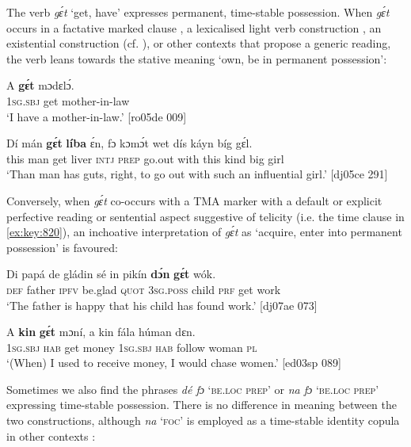 The verb \textit{gɛ́t} ‘get, have’ expresses permanent, time-stable possession. When \textit{gɛ́t} occurs in a factative marked clause , a lexicalised light verb construction , an existential construction (cf. ), or other contexts that propose a generic reading, the verb leans towards the stative meaning ‘own, be in permanent possession’: 


\ea%
    \label{ex:key:817}
    \gll A    \textbf{gɛ́t}  mɔdɛlɔ́.\\
\textsc{1sg.sbj}  get  mother-in-law\\

\glt ‘I have a mother-in-law.’ [ro05de 009]
\z


\ea%
    \label{ex:key:818}
    \gll Dí  mán    \textbf{gɛ́t}  \textbf{líba}    ɛ́n,  fɔ  kɔmɔ́t  wet    dís  káyn  bíg  gɛ́l.\\
this  man    get  liver  \textsc{intj}  \textsc{prep}  go.out  with    this   kind    big  girl\\

\glt ‘Than man has guts, right, to go out with such an influential girl.’ [dj05ce 291]
\z

Conversely, when \textit{gɛ́t} co-occurs with a TMA marker with a default or explicit perfective reading  or sentential aspect suggestive of telicity (i.e. the time clause in \ref{ex:key:820}), an inchoative interpretation of \textit{gɛ́t} as ‘acquire, enter into permanent possession’ is favoured: 


\ea%
    \label{ex:key:819}
    \gll Di  papá  de  gládin  sé    in    pikín  \textbf{dɔ́n}  \textbf{gɛ́t}  wók.\\
\textsc{def}  father  \textsc{ipfv}  be.glad  \textsc{quot}    \textsc{3sg.poss}  child  \textsc{prf}  get  work\\

\glt ‘The father is happy that his child has found work.’ [dj07ae 073]
\z


\ea%
    \label{ex:key:820}
    \gll A    \textbf{kin}  \textbf{gɛ́t}  mɔní,  a    kin  fála    húman  dɛn.\\
\textsc{1sg.sbj}  \textsc{hab}  get  money  \textsc{1sg.sbj}  \textsc{hab}  follow  woman  \textsc{pl}\\

\glt ‘(When) I used to receive money, I would chase women.’ [ed03sp 089]
\z

Sometimes we also find the phrases \textit{dé fɔ} ‘\textsc{be.loc} \textsc{prep}’ or \textit{na fɔ} ‘\textsc{be.loc} \textsc{prep}’ expressing time-stable possession. There is no difference in meaning between the two constructions, although \textit{na} ‘\textsc{foc}’ is employed as a time-stable identity copula in other contexts : 


